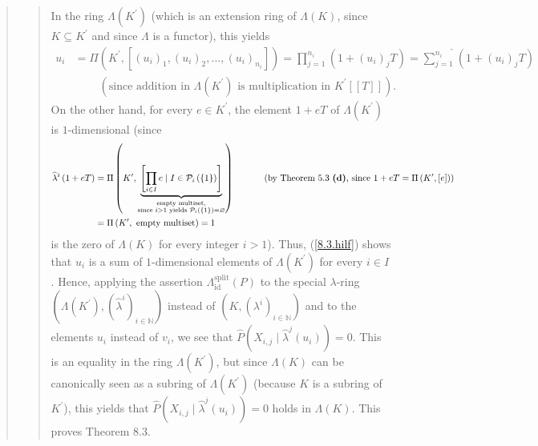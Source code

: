 \documentclass[12pt,final,notitlepage,onecolumn,german]{article}%
\begin{document}
\begin{quote}
\begin{quote}
In the ring $\Lambda\left(  K^{\prime}\right)  $ (which is an extension ring
of $\Lambda\left(  K\right)  $, since $K\subseteq K^{\prime}$ and since
$\Lambda$ is a functor), this yields%
\begin{align}
u_{i}  &  =\Pi\left(  K^{\prime},\left[  \left(  u_{i}\right)  _{1},\left(
u_{i}\right)  _{2},...,\left(  u_{i}\right)  _{n_{i}}\right]  \right)
=\prod_{j=1}^{n_{i}}\left(  1+\left(  u_{i}\right)  _{j}T\right)
=\widehat{\sum_{j=1}^{n_{i}}}\left(  1+\left(  u_{i}\right)  _{j}T\right)
\nonumber\\
&  \ \ \ \ \ \ \ \ \ \ \left(  \text{since addition in }\Lambda\left(
K^{\prime}\right)  \text{ is multiplication in }K^{\prime}\left[  \left[
T\right]  \right]  \right)  . \label{8.3.hilf}%
\end{align}
On the other hand, for every $e\in K^{\prime}$, the element $1+eT$ of
$\Lambda\left(  K^{\prime}\right)  $ is $1$-dimensional (since%
\begin{align*}
\widehat{\lambda}^{i}\left(  1+eT\right)   &  =\Pi\left(  K^{\prime
},\underbrace{\left[  \prod_{i\in I}e\mid I\in\mathcal{P}_{i}\left(  \left\{
1\right\}  \right)  \right]  }_{\substack{\text{empty multiset,}\\\text{since
}i>1\text{ yields }\mathcal{P}_{i}\left(  \left\{  1\right\}  \right)
=\varnothing}}\right)  \ \ \ \ \ \ \ \ \ \ \left(  \text{by Theorem 5.3
\textbf{(d)}, since }1+eT=\Pi\left(  K^{\prime},\left[  e\right]  \right)
\right) \\
&  =\Pi\left(  K^{\prime},\text{ empty multiset}\right)  =1
\end{align*}
is the zero of $\Lambda\left(  K\right)  $ for every integer $i>1$). Thus,
(\ref{8.3.hilf}) shows that $u_{i}$ is a sum of $1$-dimensional elements of
$\Lambda\left(  K^{\prime}\right)  $ for every $i\in I$. Hence, applying the
assertion $\Lambda_{\operatorname*{id}}^{\operatorname*{split}}\left(
P\right)  $ to the special $\lambda$-ring $\left(  \Lambda\left(  K^{\prime
}\right)  ,\left(  \widehat{\lambda}^{i}\right)  _{i\in\mathbb{N}}\right)  $
instead of $\left(  K,\left(  \lambda^{i}\right)  _{i\in\mathbb{N}}\right)  $
and to the elements $u_{i}$ instead of $v_{i}$, we see that $\widehat
{P}\left(  X_{i,j}\mid\widehat{\lambda}^{j}\left(  u_{i}\right)  \right)  =0$.
This is an equality in the ring $\Lambda\left(  K^{\prime}\right)  $, but
since $\Lambda\left(  K\right)  $ can be canonically seen as a subring of
$\Lambda\left(  K^{\prime}\right)  $ (because $K$ is a subring of $K^{\prime}%
$), this yields that $\widehat{P}\left(  X_{i,j}\mid\widehat{\lambda}%
^{j}\left(  u_{i}\right)  \right)  =0$ holds in $\Lambda\left(  K\right)  $.
This proves Theorem 8.3.


\end{quote}
\end{quote}
\end{document}
